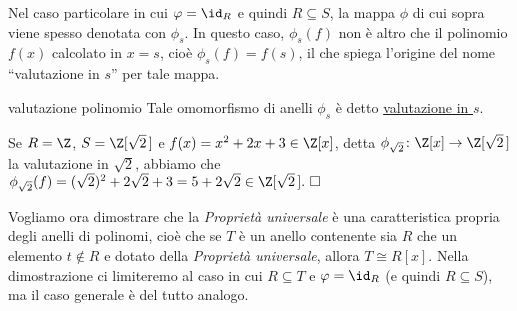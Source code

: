 \noindent Nel caso particolare in cui $\varphi=\id_R$ e quindi $R\subseteq S$, 
la mappa $\phi$ di cui sopra viene spesso denotata con $\phi_s$. 
In questo caso, $\phi_s(f)$ non è altro che il polinomio $f(x)$ calcolato in $x=s$, 
cioè $\phi_s(f)=f(s)$, il che spiega l'origine del nome ``valutazione in $s$'' per tale mappa.

\begin{defn}[]{valutazione polinomio}
Tale omomorfismo di anelli $\phi_s$ è detto \underline{valutazione in $s$}.
\end{defn}

\begin{exm}
Se $R=\Z$, $S=\Z[\sqrt{2}\,]$ e $f(x)=x^2+2x+3\in \Z[x]$, detta $\phi_{\sqrt{2}}\colon \Z[x]\to \Z[\sqrt{2}\,]$ 
la valutazione in $\sqrt{2}$, abbiamo che $\phi_{\sqrt{2}}(f)=(\sqrt{2})^2+2\sqrt{2}+3=5+2\sqrt{2}\in \Z[\sqrt{2}\,]. \ \square$
\end{exm}

\noindent Vogliamo ora dimostrare che la \emph{Proprietà universale} è una caratteristica propria degli anelli di polinomi, 
cioè che se $T$ è un anello contenente sia $R$ che un elemento $t\notin R$ e dotato della \emph{Proprietà universale}, 
allora $T\cong R[x]$. Nella dimostrazione ci limiteremo al caso in cui $R\subseteq T$ e $\varphi=\id_R$ (e quindi $R\subseteq S$), 
ma il caso generale è del tutto analogo.

